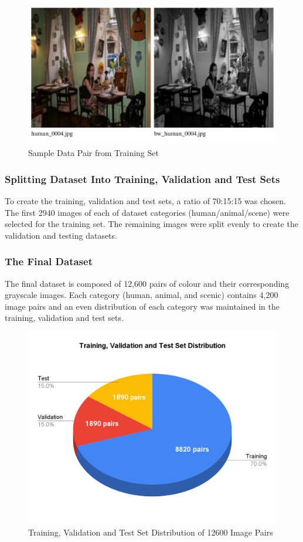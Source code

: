 \documentclass{article} %
\begin{document}
\begin{figure}[htbp]            %
  \centering
  \includegraphics[width=0.68\linewidth]{Figs/Data Example.png}
  \caption{Sample Data Pair from Training Set}
  \label{fig:data_example}
\end{figure}

 \subsubsection{Splitting Dataset Into Training, Validation and Test Sets}

To create the training, validation and test sets, a ratio of 70:15:15 was chosen. The first 2940 images of each of dataset categories (human/animal/scene) were selected for the training set. The remaining images were split evenly to create the validation and testing datasets. 

\subsubsection{The Final Dataset}

The final dataset is composed of 12,600 pairs of colour and their corresponding grayscale images. Each category (human, animal, and scenic) contains 4,200 image pairs and an even distribution of each category was maintained in the training, validation and test sets.

\begin{figure}[htbp]            %
  \centering
  \includegraphics[width=0.6\linewidth]{Figs/dataset1.png}
  \caption{Training, Validation and Test Set Distribution of 12600 Image Pairs}
  \label{fig:dataset}
\end{figure}
\end{document}
